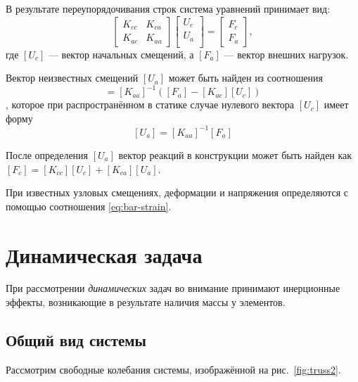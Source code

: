 \documentclass[10pt]{article}
\numberwithin{equation}{section}
\newcommand{\matr}[1]{[#1]}
\newcommand{\figref}[1]{рис. \ref{#1}}
\begin{document}
В результате переупорядочивания строк система уравнений принимает вид:
\begin{equation*}
  \label{eq:system-partitioned}
  \begin{bmatrix}
    K_{cc}& K_{ca} \\
    K_{ac}& K_{aa}
  \end{bmatrix}
  \begin{bmatrix}
    U_c\\
    U_a\\
  \end{bmatrix}
  =
  \begin{bmatrix}
    F_c\\
    F_a
  \end{bmatrix},
\end{equation*}
где $\matr{U_c}$ — вектор начальных смещений, а $\matr{F_a}$ — вектор
внешних нагрузок.

Вектор неизвестных смещений $\matr{U_a}$ может быть найден из соотношения
\begin{equation}
  \matr{U_a} = \matr{K_{aa}}^{-1}(\matr{F_a} - \matr{K_{ac}}\matr{U_c})
\end{equation},
которое при распространённом в статике случае нулевого вектора
$\matr{U_c}$ имеет форму
\begin{equation}
  \label{eq:displacements}
  \matr{U_a} = \matr{K_{aa}}^{-1}\matr{F_a}
\end{equation}

После определения $\matr{U_a}$ вектор реакций в конструкции может быть
найден как $\matr{F_c} = \matr{K_{cc}}\matr{U_c} +
\matr{K_{ca}}\matr{U_a}$.

При известных узловых смещениях, деформации и напряжения определяются
с помощью соотношения \eqref{eq:bar-strain}.

\clearpage
\section{Динамическая задача}

При рассмотрении \emph{динамических} задач во внимание принимают
инерционные эффекты, возникающие в результате наличия массы у
элементов.

\subsection{Общий вид системы}
\label{sec:dynamic-truss}

Рассмотрим свободные колебания системы, изображённой на
\figref{fig:truss2}.
\end{document}
